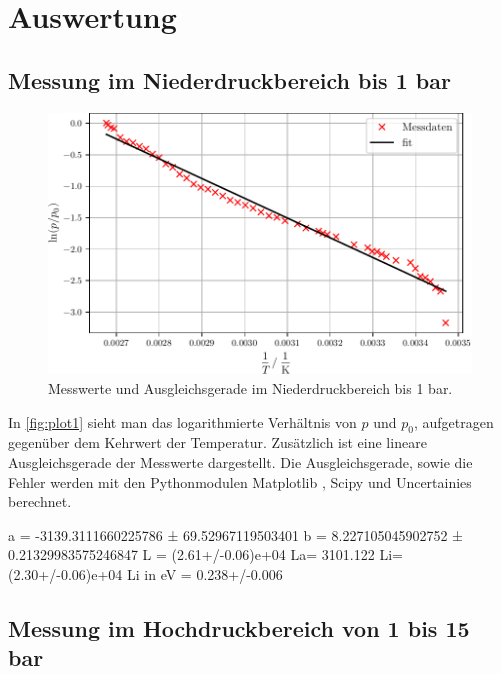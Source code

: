 \section{Auswertung}
\label{sec:Auswertung}
\subsection{Messung im Niederdruckbereich bis 1 bar} %
\label{sub:Niederdruck_aus}


\begin{figure}
  \centering
  \includegraphics[scale=0.7]{build/plot1.pdf}
  \caption{Messwerte und Ausgleichsgerade im Niederdruckbereich bis 1 bar.}
  \label{fig:plot1}
\end{figure}

In \autoref{fig:plot1} sieht man das logarithmierte Verhältnis von $p$ und $p_0$, aufgetragen gegenüber dem Kehrwert der Temperatur. 
Zusätzlich ist eine lineare Ausgleichsgerade der Messwerte dargestellt. Die Ausgleichsgerade, sowie die Fehler werden mit den Pythonmodulen Matplotlib \cite{matplotlib}
, Scipy \cite{scipy} und Uncertainies \cite{uncertainties} berechnet.

a = -3139.3111660225786 ± 69.52967119503401
b = 8.227105045902752 ± 0.21329983575246847
L = (2.61+/-0.06)e+04
La= 3101.122
Li= (2.30+/-0.06)e+04
Li in eV = 0.238+/-0.006

\subsection{Messung im Hochdruckbereich von 1 bis 15 bar} %
\label{sub:Hochdruck_aus}


